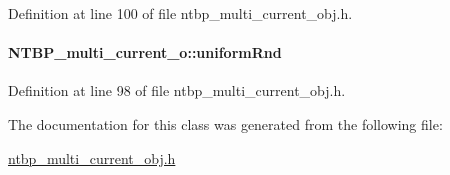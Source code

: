 Definition at line 100 of file ntbp\_\-multi\_\-current\_\-obj.h.

\paragraph[{uniformRnd}]{ {\bf NTBP\_\-multi\_\-current\_\-o::uniformRnd}}\hfill\label{class_n_t_b_p__multi__current__o_abf2890fcf3086565a614b898b8ec3734}


Definition at line 98 of file ntbp\_\-multi\_\-current\_\-obj.h.



The documentation for this class was generated from the following file:\begin{DoxyCompactItemize}
\item 
\hyperlink{ntbp__multi__current__obj_8h}{ntbp\_\-multi\_\-current\_\-obj.h}\end{DoxyCompactItemize}
